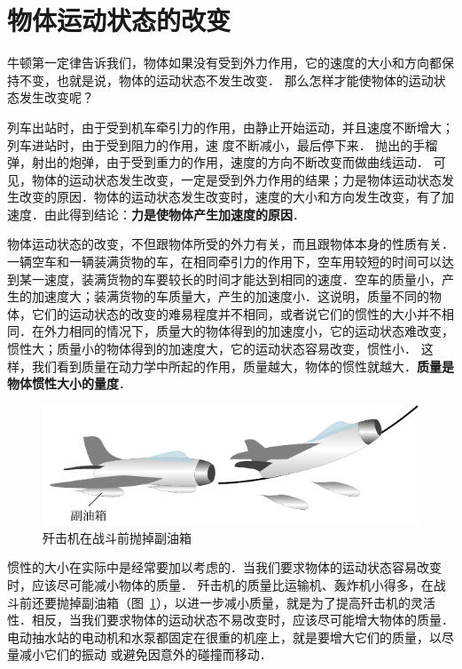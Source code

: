 \section{物体运动状态的改变}
牛顿第一定律告诉我们，物体如果没有受到外力作用，它的速度的大小和方向都保持不变，也就是说，物体的运动状态不发生改变．
那么怎样才能使物体的运动状态发生改变呢？

列车出站时，由于受到机车牵引力的作用，由静止开始运动，并且速度不断增大；列车进站时，由于受到阻力的作用，速
度不断减小，最后停下来．
抛出的手榴弹，射出的炮弹，由于受到重力的作用，速度的方向不断改变而做曲线运动．
可见，物体的运动状态发生改变，一定是受到外力作用的结果；力是物体运动状态发生改变的原因．物体的运动状态发生改变时，速度的大小和方向发生改变，有了加速度．由此得到结论：\textbf{力是使物体产生加速度的原因}．

物体运动状态的改变，不但跟物体所受的外力有关，而且跟物体本身的性质有关．
一辆空车和一辆装满货物的车，在相同牵引力的作用下，空车用较短的时间可以达到某一速度，装满货物的车要较长的时间才能达到相同的速度．空车的质量小，产生的加速度大；装满货物的车质量大，产生的加速度小．这说明，质量不同的物体，它们的运动状态的改变的难易程度并不相同，或者说它们的惯性的大小并不相同．在外力相同的情况下，质量大的物体得到的加速度小，它的运动状态难改变，惯性大；质量小的物体得到的加速度大，它的运动状态容易改变，惯性小．
这样，我们看到质量在动力学中所起的作用，质量越大，物体的惯性就越大．\textbf{质量是物体惯性大小的量度}．

\begin{figure}[htp]
    \centering
    \includegraphics{fig/A/3-2.pdf}
    \caption{歼击机在战斗前抛掉副油箱}\label{fig_A_3-2}
\end{figure}

惯性的大小在实际中是经常要加以考虑的．当我们要求物体的运动状态容易改变时，应该尽可能减小物体的质量．
歼击机的质量比运输机、轰炸机小得多，在战斗前还要抛掉副油箱（图~\ref{fig_A_3-2}），以进一步减小质量，就是为了提高歼击机的灵活性．相反，当我们要求物体的运动状态不易改变时，应该尽可能增大物体的质量．
电动抽水站的电动机和水泵都固定在很重的机座上，就是要增大它们的质量，以尽量减小它们的振动
或避免因意外的碰撞而移动．

